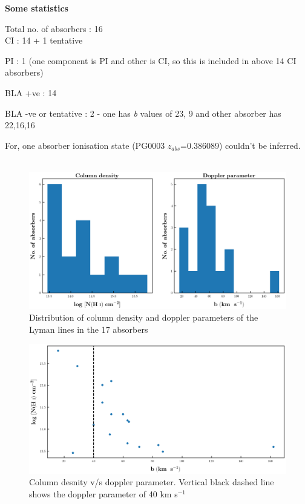 \documentclass[12pt]{report}
\begin{document}
\newpage

\large{\textbf{Some statistics}}

Total no. of absorbers : 16 \\

CI : 14 + 1 tentative 

PI : 1 (one component is PI and other is CI, so this is included in above 14 CI absorbers)

BLA +ve : 14 

BLA -ve or tentative : 2 - one has \emph{b} values of 23, 9 and other absorber has 22,16,16 

For, one absorber ionisation state (PG0003 $z_{abs}$=0.386089) couldn't be inferred. \\\\


\begin{figure}[h]
\centering
\includegraphics[width=\linewidth]{Distribution_NH_b.png}
\caption{Distribution of column density and doppler parameters of the Lyman lines in the 17 absorbers}
\end{figure}

\begin{figure}[h]
\centering
\includegraphics[width=\linewidth]{NH_vs_b_1.png}
\caption{Column desnity v/s doppler parameter. Vertical black dashed line shows the doppler parameter of 40 km s$^{-1}$}
\end{figure}
\end{document}
